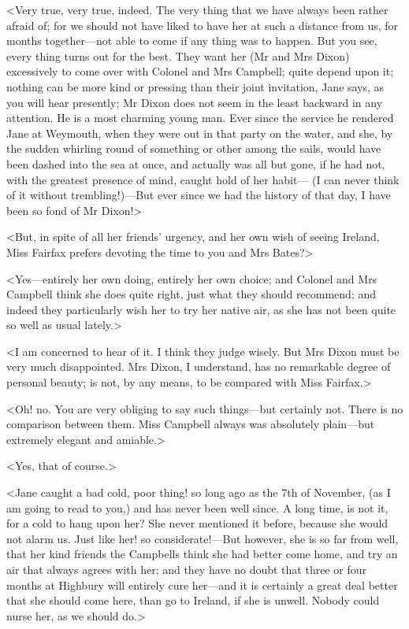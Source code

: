 <Very true, very true, indeed. The very thing that we have always been rather afraid of; for we should not have liked to have her at such a distance from us, for months together—not able to come if any thing was to happen. But you see, every thing turns out for the best. They want her (Mr and Mrs Dixon) excessively to come over with Colonel and Mrs Campbell; quite depend upon it; nothing can be more kind or pressing than their joint invitation, Jane says, as you will hear presently; Mr Dixon does not seem in the least backward in any attention. He is a most charming young man. Ever since the service he rendered Jane at Weymouth, when they were out in that party on the water, and she, by the sudden whirling round of something or other among the sails, would have been dashed into the sea at once, and actually was all but gone, if he had not, with the greatest presence of mind, caught hold of her habit— (I can never think of it without trembling!)—But ever since we had the history of that day, I have been so fond of Mr Dixon!>

<But, in spite of all her friends' urgency, and her own wish of seeing Ireland, Miss Fairfax prefers devoting the time to you and Mrs Bates?>

<Yes—entirely her own doing, entirely her own choice; and Colonel and Mrs Campbell think she does quite right, just what they should recommend; and indeed they particularly wish her to try her native air, as she has not been quite so well as usual lately.>

<I am concerned to hear of it. I think they judge wisely. But Mrs Dixon must be very much disappointed. Mrs Dixon, I understand, has no remarkable degree of personal beauty; is not, by any means, to be compared with Miss Fairfax.>

<Oh! no. You are very obliging to say such things—but certainly not. There is no comparison between them. Miss Campbell always was absolutely plain—but extremely elegant and amiable.>

<Yes, that of course.>

<Jane caught a bad cold, poor thing! so long ago as the 7th of November, (as I am going to read to you,) and has never been well since. A long time, is not it, for a cold to hang upon her? She never mentioned it before, because she would not alarm us. Just like her! so considerate!—But however, she is so far from well, that her kind friends the Campbells think she had better come home, and try an air that always agrees with her; and they have no doubt that three or four months at Highbury will entirely cure her—and it is certainly a great deal better that she should come here, than go to Ireland, if she is unwell. Nobody could nurse her, as we should do.>

